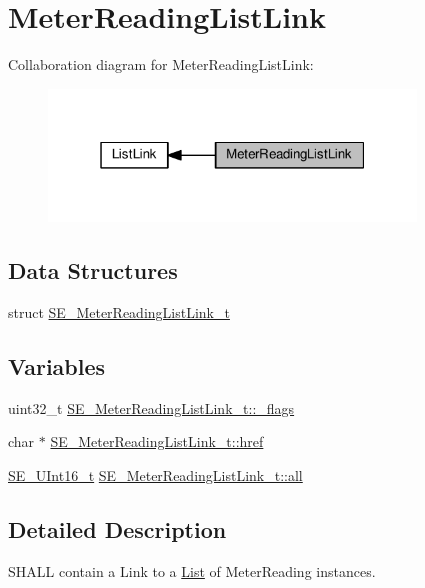 \hypertarget{group__MeterReadingListLink}{}\section{Meter\+Reading\+List\+Link}
\label{group__MeterReadingListLink}
Collaboration diagram for Meter\+Reading\+List\+Link\+:\nopagebreak
\begin{figure}[H]
\begin{center}
\leavevmode
\includegraphics[width=277pt]{group__MeterReadingListLink}
\end{center}
\end{figure}
\subsection*{Data Structures}
\begin{DoxyCompactItemize}
\item 
struct \hyperlink{structSE__MeterReadingListLink__t}{S\+E\+\_\+\+Meter\+Reading\+List\+Link\+\_\+t}
\end{DoxyCompactItemize}
\subsection*{Variables}
\begin{DoxyCompactItemize}
\item 
uint32\+\_\+t \hyperlink{group__MeterReadingListLink_ga1272652a9d058acde8f3dcecf383693c}{S\+E\+\_\+\+Meter\+Reading\+List\+Link\+\_\+t\+::\+\_\+flags}
\item 
char $\ast$ \hyperlink{group__MeterReadingListLink_ga319b0a4be54e74724d6291cf2c043050}{S\+E\+\_\+\+Meter\+Reading\+List\+Link\+\_\+t\+::href}
\item 
\hyperlink{group__UInt16_gac68d541f189538bfd30cfaa712d20d29}{S\+E\+\_\+\+U\+Int16\+\_\+t} \hyperlink{group__MeterReadingListLink_gaa08693c64dd99f9871b9eb4e6bf45503}{S\+E\+\_\+\+Meter\+Reading\+List\+Link\+\_\+t\+::all}
\end{DoxyCompactItemize}


\subsection{Detailed Description}
S\+H\+A\+LL contain a Link to a \hyperlink{structList}{List} of Meter\+Reading instances. 

